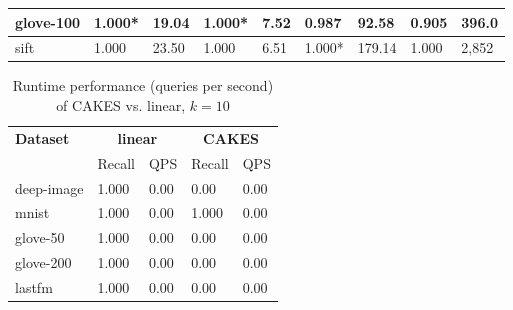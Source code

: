 \begin{table*}[!t]
\begin{center}
\begin{small}
\begin{sc}
\begin{tabular}{|l|p{1cm}|p{1cm}|p{1cm}|p{1cm}|p{1cm}|p{1cm}|p{1cm}|p{1cm}|}
    \hline
    glove-100             & 1.000* &  19.04                          & 1.000* & 7.52                                 & 0.987 & 92.58                                                    & 0.905 & 396.0 \\
    \hline
    sift                  & 1.000 &  23.50                          & 1.000 & 6.51                                  & 1.000* & 179.14                                                    & 1.000 & 2,852 \\                                                 
    \hline
    \end{tabular}
    \end{sc}
    \end{small}
    \end{center}
    \vskip -0.1in
    \end{table*}


\begin{table*}[!t]
    \caption{Runtime performance (queries per second) of CAKES vs. linear, $k=10$}
    \label{table:results:ann-alt-10}
    \vskip 0.15in
    \begin{center}
    \begin{small}
    \begin{sc}
    \begin{tabular}{|l|l|l|l|l|}
    \textbf{Dataset}  & \multicolumn{2}{|c|}{\textbf{linear}} & \multicolumn{2}{|c|}{\textbf{CAKES}}  \\
    &                    Recall & QPS                           & Recall & QPS                           \\
    \hline
    deep-image             & 1.000 & 0.00                           & 0.00 & 0.00      \\
    \hline
    mnist                   & 1.000 & 0.00                          & 1.000 & 0.00      \\
    \hline
    glove-50               & 1.000 & 0.00                           & 0.00 & 0.00      \\
    \hline 
    glove-200              & 1.000 & 0.00                           & 0.00 & 0.00     \\
    \hline
    lastfm                 & 1.000 & 0.00                           & 0.00 & 0.00           \\
    \hline
    \end{tabular}
    \end{sc}
    \end{small}
    \end{center}
    \vskip -0.1in
    \end{table*}


